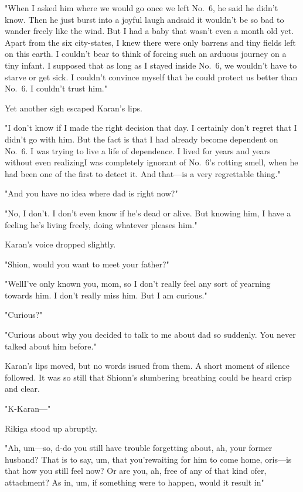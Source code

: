 "When I asked him where we would go once we left No.~6, he said he
didn't know. Then he just burst into a joyful laugh and\el said it
wouldn't be so bad to wander freely like the wind. But I had a baby that
wasn't even a month old yet. Apart from the six city-states, I knew
there were only barrens and tiny fields left on this earth. I couldn't
bear to think of forcing such an arduous journey on a tiny infant. I
supposed that as long as I stayed inside No.~6, we wouldn't have to
starve or get sick. I couldn't convince myself that he could protect us
better than No.~6. I couldn't trust him."

Yet another sigh escaped Karan's lips.

"I don't know if I made the right decision that day. I certainly don't
regret that I didn't go with him. But the fact is that I had already
become dependent on No.~6. I was trying to live a life of dependence. I
lived for years and years without even realizing\el I was completely
ignorant of No.~6's rotting smell, when he had been one of the first to
detect it. And that---is a very regrettable thing."

"And you have no idea where dad is right now?"

"No, I don't. I don't even know if he's dead or alive. But knowing him,
I have a feeling he's living freely, doing whatever pleases him."

Karan's voice dropped slightly.

"Shion, would you want to meet your father?"

"Well\el I've only known you, mom, so I don't really feel any sort of
yearning towards him. I don't really miss him. But I am curious."

"Curious?"

"Curious about why you decided to talk to me about dad so suddenly. You
never talked about him before."

Karan's lips moved, but no words issued from them. A short moment of
silence followed. It was so still that Shionn's slumbering breathing
could be heard crisp and clear.

"K-Karan---"

Rikiga stood up abruptly.

"Ah, um---so, d-do you still have trouble forgetting about, ah, your
former husband? That is to say, um, that you're\el waiting for him to
come home, or\el is---is that how you still feel now? Or are you, ah, free
of any of that kind of\el er, attachment? As in, um, if something were
to happen, would it result in\el "

